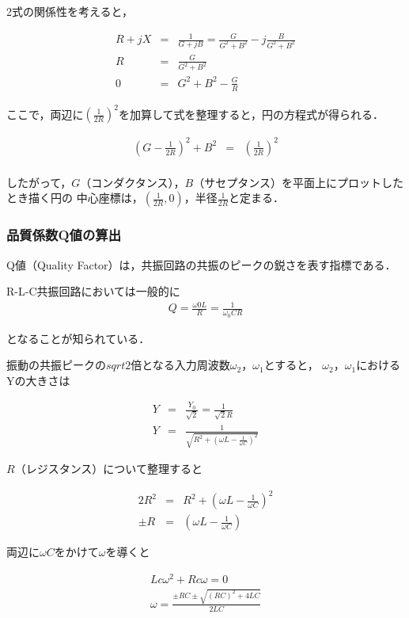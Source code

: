 \documentclass[dvipdfmx,titlepage,a4j]{jsarticle}  %
\begin{document}
2式の関係性を考えると，

\begin{eqnarray}
  R + jX &=& \frac{1}{G + jB} = \frac{G}{G^2 + B^2} -j\frac{B}{G^2 + B^2} \\
  R &=& \frac{G}{G^2 + B^2} \\
  0 &=& G^2 + B^2 - \frac{G}{R}
\end{eqnarray}

ここで，両辺に$(\frac{1}{2R})^2$を加算して式を整理すると，円の方程式が得られる．

\begin{eqnarray}
  (G - \frac{1}{2R})^2 + B^2 &=& (\frac{1}{2R})^2 \\
\end{eqnarray}

したがって，$G$（コンダクタンス），$B$（サセプタンス）を平面上にプロットしたとき描く円の
中心座標は，$(\frac{1}{2R}, 0)$，半径$\frac{1}{2R}$と定まる．

\subsubsection{品質係数Q値の算出}
Q値（Quality Factor）は，共振回路の共振のピークの鋭さを表す指標である．

R-L-C共振回路においては一般的に
\begin{eqnarray}
  Q = \frac{\omega 0 L}{R} = \frac{1}{\omega_0 CR}
\end{eqnarray}

となることが知られている．

振動の共振ピークの$sqrt{2}$倍となる入力周波数$\omega_2$，$\omega_1$とすると，
$\omega_2$，$\omega_1$におけるYの大きさは

\begin{eqnarray}
  Y &=& \frac{Y_0}{\sqrt{2}} = \frac{1}{\sqrt{2}R} \\
  Y &=& \frac{1}{\sqrt{R^2 + (\omega L - \frac{1}{\omega C})^2}}
\end{eqnarray}

$R$（レジスタンス）について整理すると

\begin{eqnarray}
  2R^2 &=& R^2 + (\omega L - \frac{1}{\omega C})^2 \\
  \pm R &=& (\omega L - \frac{1}{\omega C})
\end{eqnarray}

両辺に$\omega C$をかけて$\omega$を導くと

\begin{eqnarray}
  Lc \omega^2 + Rc\omega = 0\\
  \omega = \frac{\pm RC \pm \sqrt{(RC)^2 + 4LC}}{2LC}
\end{eqnarray}
\end{document}
